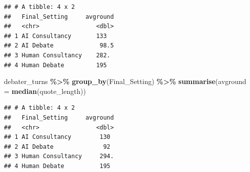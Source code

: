 \documentclass[
]{article}
\newenvironment{Shaded}{\begin{snugshade}}{\end{snugshade}}
\newcommand{\AttributeTok}[1]{\textcolor[rgb]{0.13,0.29,0.53}{#1}}
\newcommand{\ConstantTok}[1]{\textcolor[rgb]{0.56,0.35,0.01}{#1}}
\newcommand{\DecValTok}[1]{\textcolor[rgb]{0.00,0.00,0.81}{#1}}
\newcommand{\FunctionTok}[1]{\textcolor[rgb]{0.13,0.29,0.53}{\textbf{#1}}}
\newcommand{\NormalTok}[1]{#1}
\newcommand{\OtherTok}[1]{\textcolor[rgb]{0.56,0.35,0.01}{#1}}
\newcommand{\SpecialCharTok}[1]{\textcolor[rgb]{0.81,0.36,0.00}{\textbf{#1}}}
\newcommand{\StringTok}[1]{\textcolor[rgb]{0.31,0.60,0.02}{#1}}
\begin{document}
\begin{verbatim}
## # A tibble: 4 x 2
##   Final_Setting     avground
##   <chr>                <dbl>
## 1 AI Consultancy       133  
## 2 AI Debate             98.5
## 3 Human Consultancy    282. 
## 4 Human Debate         195
\end{verbatim}

\begin{Shaded}
\begin{Highlighting}[]
\NormalTok{debater\_turns }\SpecialCharTok{\%\textgreater{}\%} \FunctionTok{group\_by}\NormalTok{(Final\_Setting) }\SpecialCharTok{\%\textgreater{}\%} \FunctionTok{summarise}\NormalTok{(}\AttributeTok{avground =} \FunctionTok{median}\NormalTok{(quote\_length))}
\end{Highlighting}
\end{Shaded}

\begin{verbatim}
## # A tibble: 4 x 2
##   Final_Setting     avground
##   <chr>                <dbl>
## 1 AI Consultancy        130 
## 2 AI Debate              92 
## 3 Human Consultancy     294.
## 4 Human Debate          195
\end{verbatim}

\begin{Shaded}
\end{Shaded}
\end{document}

